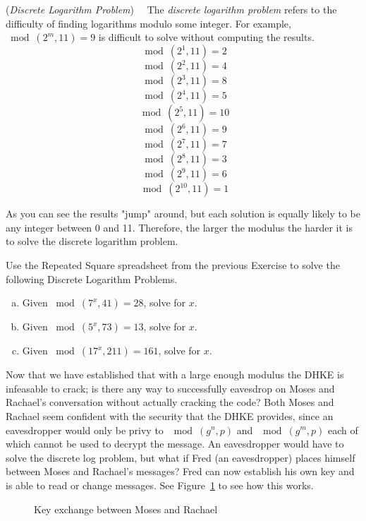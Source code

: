 \begin{defn} \label{def:DLP}(\emph{Discrete Logarithm Problem})~~
The \emph{discrete logarithm problem} refers to the difficulty of finding logarithms modulo some integer. For example, $\bmod(2^{m},  11) = 9$ is difficult to solve without computing the results.
$$ \bmod(2^{1}, 11)=2$$
$$ \bmod(2^{2}, 11)=4$$
$$ \bmod(2^{3}, 11)=8$$
$$ \bmod(2^{4}, 11)=5$$
$$ \bmod(2^{5}, 11)=10$$
$$ \bmod(2^{6}, 11)=9$$
$$ \bmod(2^{7}, 11)=7$$
$$ \bmod(2^{8}, 11)=3$$
$$ \bmod(2^{9}, 11)=6$$
$$ \bmod(2^{10}, 11)=1$$

As you can see the results "jump" around, but each solution is equally likely to be any integer between 0 and 11.  Therefore, the larger the modulus the harder it is to solve the discrete logarithm problem.
\end{defn}
\begin{exer}
Use the Repeated Square spreadsheet from the previous Exercise to solve the following Discrete Logarithm Problems.  
\begin{enumerate}[(a)]
\item Given $ \bmod(7^{x}, 41)=28$, solve for $x$.

\item Given $ \bmod(5^{x}, 73)=13$, solve for $x$.

\item Given $ \bmod(17^{x}, 211)=161$, solve for $x$.
\end{enumerate}
\end{exer}
Now that we have established that with a large enough modulus the DHKE is infeasable to crack; is there any way to successfully eavesdrop on Moses and Rachael's conversation without actually cracking the code?  Both Moses and Rachael seem confident with the security that the DHKE provides, since an eavesdropper would only be privy to $\mod (g^n , p)$ and $\mod (g^m , p)$ each of which cannot be used to decrypt the message.  An eavesdropper would have to solve the discrete log problem, but what if Fred (an eavesdropper) places himself between Moses and Rachael's messages?  Fred can now establish his own key and is able to read or change messages.  See Figure~\ref{fig:DH:DHKE_2} to see how this works.
\begin{figure}[H]
	  \caption{\label{fig:DH:DHKE_2} Key exchange between Moses and Rachael }
\end{figure}

